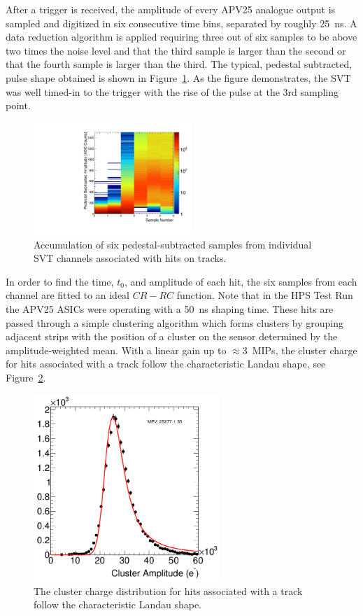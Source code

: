 \documentclass[final,3p,times,twocolumn]{elsarticle}
\begin{document}
After a trigger is received, the amplitude of every  APV25 analogue output is sampled and digitized in 
six consecutive time bins, separated by roughly 25~ns.  A data reduction algorithm is applied 
requiring three out of six samples to be above two times the noise level and that the third sample is 
larger than the second or that the fourth sample is larger than the third.
The typical, pedestal subtracted, pulse shape obtained is shown in Figure~\ref{fig:pulse_shape}. 
As the figure demonstrates,  the SVT was well timed-in to the trigger with the rise of the pulse at the 3rd 
sampling point. 
\begin{figure}[]
\begin{center}
{\small
	\includegraphics[width=6cm]{figures/run1351_110513_samples_L1_top.pdf}
	\caption{Accumulation of six pedestal-subtracted samples from individual SVT channels associated 
	with hits on tracks.}
	\label{fig:pulse_shape}
}
\end{center}
\end{figure}
In order to find the time, $t_0$, and amplitude of each hit, the six samples from each channel are fitted 
to an ideal $CR-RC$ function. Note that in the HPS Test Run the APV25 ASICs were operating with a 50~ns 
shaping time. These hits are passed through a simple clustering algorithm which forms clusters by 
grouping adjacent strips with the position of a cluster on the sensor determined by the 
amplitude-weighted mean.
With a linear gain up to $\approx 3$~MIPs, the cluster charge for hits associated with a track follow 
the characteristic Landau shape, see Figure~\ref{fig:cluster_pulse}.  
\begin{figure}[]
\begin{center}
{\small
	\includegraphics[width=7cm]{figures/mip_top_layer_2.png}
    	\caption{ The cluster charge distribution for hits associated with a track follow the characteristic 		Landau shape. }
	\label{fig:cluster_pulse}
}
\end{center}
\end{figure}
\end{document}
